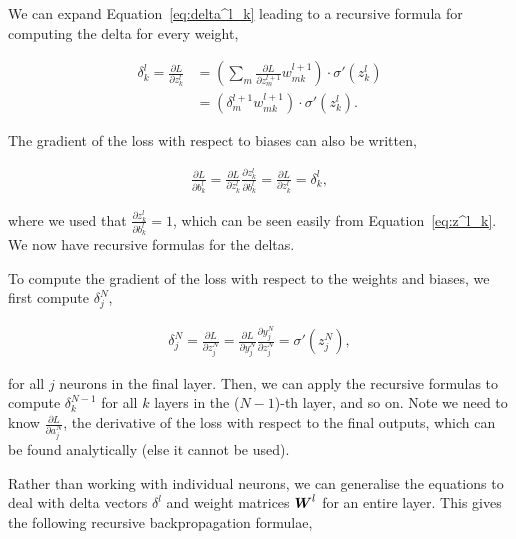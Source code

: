 We can expand Equation~\ref{eq:delta^l_k} leading to a recursive formula for computing the delta for every weight,

\begin{align}
    \delta^l_k = \frac{\partial L}{\partial z^l_k} &= \left(
        \sum_{m} \frac{\partial L}{\partial z^{l+1}_m} w^{l+1}_{mk}
    \right) \cdot
    \sigma'(z^l_k) \\
    &= \left(
        \delta^{l+1}_m w^{l+1}_{mk}
    \right) \cdot
    \sigma'(z^l_k).
\end{align}

The gradient of the loss with respect to biases can also be written,

\begin{align}
    \frac{\partial L}{\partial b^l_k} = \frac{\partial L}{\partial z^l_k} \frac{\partial z^l_k}{\partial b^l_k} = \frac{\partial L}{\partial z^l_k} = \delta^l_k,
\end{align}

where we used that \(\frac{\partial z^l_k}{\partial b^l_k} = 1\), which can be seen easily from Equation~\ref{eq:z^l_k}.
We now have recursive formulas for the deltas.

To compute the gradient of the loss with respect to the weights and biases, we first compute \(\delta^N_j\),

\begin{align}
    \delta^N_j = \frac{\partial L}{\partial z^N_j} = \frac{\partial L}{\partial y^N_j} \frac{\partial y^N_j}{\partial z^N_j} = \sigma'(z^N_j),
\end{align}

for all \(j\) neurons in the final layer. Then, we can apply the recursive formulas to compute \(\delta^{N-1}_k\) for all \(k\) layers in the (\(N-1\))-th layer, and so on.
Note we need to know \(\frac{\partial L}{\partial a^N_j}\), the derivative of the loss with respect to the final outputs, which can be found analytically (else it cannot be used).

Rather than working with individual neurons, we can generalise the equations to deal with delta vectors \(\delta^l\) and weight matrices \({\boldsymbol{{W}}}^l\) for an entire layer.
This gives the following recursive backpropagation formulae,

